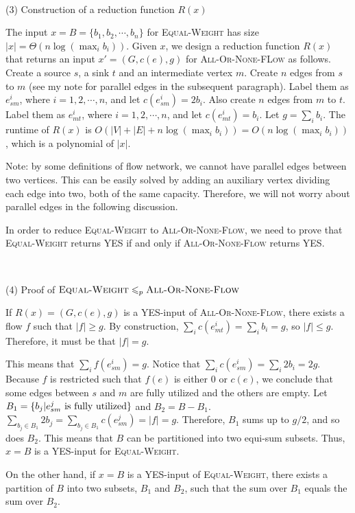 \documentclass{article}
\begin{document}
~

\noindent(3) Construction of a reduction function $R(x)$

The input $x=B=\{b_1,b_2,\cdots,b_n\}$ for \textsc{Equal-Weight} has size $|x|=\Theta(n\log(\max_ib_i))$. Given $x$, we design a reduction function $R(x)$ that returns an input $x'=(G,c(e),g)$ for \textsc{All-Or-None-FLow} as follows. Create a source $s$, a sink $t$ and an intermediate vertex $m$. Create $n$ edges from $s$ to $m$ (see my note for parallel edges in the subsequent paragraph). Label them as $e_{sm}^i$, where $i=1,2,\cdots,n$, and let $c(e_{sm}^i)=2b_i$. Also create $n$ edges from $m$ to $t$. Label them as $e_{mt}^i$, where $i=1,2,\cdots,n$, and let $c(e_{mt}^i)=b_i$. Let $g=\sum_ib_i$. The runtime of $R(x)$ is $O(|V|+|E|+n\log(\max_ib_i))=O(n\log(\max_ib_i))$, which is a polynomial of $|x|$.

Note: by some definitions of flow network, we cannot have parallel edges between two vertices. This can be easily solved by adding an auxiliary vertex dividing each edge into two, both of the same capacity. Therefore, we will not worry about parallel edges in the following discussion.

In order to reduce \textsc{Equal-Weight} to \textsc{All-Or-None-Flow}, we need to prove that \textsc{Equal-Weight} returns YES if and only if \textsc{All-Or-None-Flow} returns YES.

~

\noindent(4) Proof of $\textsc{Equal-Weight}\leqslant_p\textsc{All-Or-None-Flow}$

If $R(x)=(G,c(e),g)$ is a YES-input of \textsc{All-Or-None-Flow}, there exists a flow $f$ such that $|f|\geqslant g$. By construction, $\sum_ic(e_{mt}^i)=\sum_ib_i=g$, so $|f|\leqslant g$. Therefore, it must be that $|f|=g$.

This means that $\sum_if(e_{sm}^i)=g$. Notice that $\sum_ic(e_{sm}^i)=\sum_i2b_i=2g$. Because $f$ is restricted such that $f(e)$ is either 0 or $c(e)$, we conclude that some edges between $s$ and $m$ are fully utilized and the others are empty. Let $B_1=\{b_j|e_{sm}^j\textup{ is fully utilized}\}$ and $B_2=B-B_1$. $\sum_{b_j\in B_1}2b_j=\sum_{b_j\in B_1}c(e_{sm}^j)=|f|=g$. Therefore, $B_1$ sums up to $g/2$, and so does $B_2$. This means that $B$ can be partitioned into two equi-sum subsets. Thus, $x=B$ is a YES-input for \textsc{Equal-Weight}.

On the other hand, if $x=B$ is a YES-input of \textsc{Equal-Weight}, there exists a partition of $B$ into two subsets, $B_1$ and $B_2$, such that the sum over $B_1$ equals the sum over $B_2$.
\end{document}
